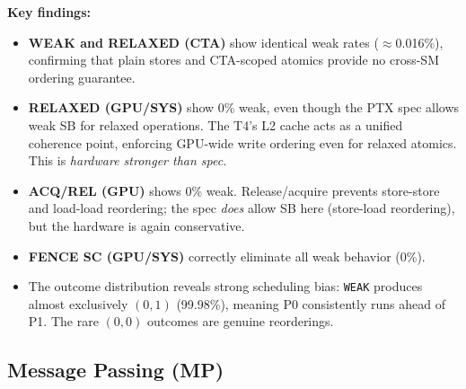 \documentclass[a4paper]{article}
\begin{document}
\textbf{Key findings:}
\begin{itemize}
  \item \textbf{WEAK and RELAXED (CTA)} show identical weak rates ($\approx$0.016\%), confirming that plain stores and CTA-scoped atomics provide no cross-SM ordering guarantee.
  \item \textbf{RELAXED (GPU/SYS)} show 0\% weak, even though the PTX spec allows weak SB for relaxed operations. The T4's L2 cache acts as a unified coherence point, enforcing GPU-wide write ordering even for relaxed atomics. This is \emph{hardware stronger than spec}.
  \item \textbf{ACQ/REL (GPU)} shows 0\% weak. Release/acquire prevents store-store and load-load reordering; the spec \emph{does} allow SB here (store-load reordering), but the hardware is again conservative.
  \item \textbf{FENCE SC (GPU/SYS)} correctly eliminate all weak behavior (0\%).
  \item The outcome distribution reveals strong scheduling bias: \texttt{WEAK} produces almost exclusively $(0,1)$ (99.98\%), meaning P0 consistently runs ahead of P1. The rare $(0,0)$ outcomes are genuine reorderings.
\end{itemize}

\subsection{Message Passing (MP)}
\end{document}
